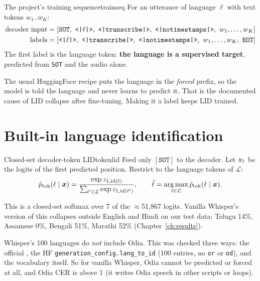 \begin{definition}{The project's training sequence}{trainseq}
For an utterance of language $\ell$ with text tokens $w_1..w_K$:
\begin{align*}
\text{decoder input}&=[\texttt{SOT},\ \tok{$\ell$},\ \tok{transcribe},\ \tok{notimestamps},\ w_1,\dots,w_K]\\
\text{labels}&=[\tok{$\ell$},\ \tok{transcribe},\ \tok{notimestamps},\ w_1,\dots,w_K,\ \texttt{EOT}]
\end{align*}
The first label is the language token: \textbf{the language is a supervised target}, predicted from \texttt{SOT} and the audio alone.
\end{definition}

The usual HuggingFace recipe puts the language in the \emph{forced} prefix, so the model is told the language and never learns to
predict it. That is the documented cause of LID collapse after fine-tuning. Making it a label keeps LID trained.

\section{Built-in language identification}

\begin{definition}{Closed-set decoder-token LID}{tokenlid}
Feed only $[\texttt{SOT}]$ to the decoder. Let $\bm{z}_1$ be the logits of the first predicted position. Restrict to the language
tokens of $\mathcal L$:
\[
\hat p_{\text{tok}}(\ell\mid\bm{x})=\frac{\exp z_{1,\mathrm{id}(\ell)}}{\sum_{\ell'\in\mathcal L}\exp z_{1,\mathrm{id}(\ell')}},
\qquad \hat\ell=\operatorname*{arg\,max}_{\ell\in\mathcal L}\hat p_{\text{tok}}(\ell\mid\bm{x}).
\]
\end{definition}

This is a closed-set softmax over 7 of the $\approx$51{,}867 logits. Vanilla Whisper's version of this collapses outside
English and Hindi on our test data: Telugu 14\%, Assamese 0\%, Bengali 51\%, Marathi 52\% (Chapter~\ref{ch:results}).

\begin{vivatip}[: Odia]
Whisper's 100 languages do \emph{not} include Odia. This was checked three ways: the official , the HF
\texttt{generation\_config.lang\_to\_id} (100 entries, no \texttt{or} or \texttt{od}), and the vocabulary itself. So for vanilla
Whisper, Odia cannot be predicted or forced at all, and Odia CER is above 1 (it writes Odia speech in other scripts or loops).
\end{vivatip}

